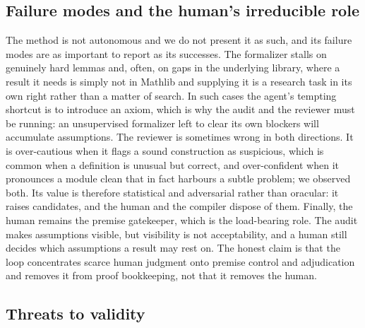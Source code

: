 \documentclass[11pt]{article}
\begin{document}
\subsection{Failure modes and the human's irreducible role}

The method is not autonomous and we do not present it as such, and its failure modes are as
important to report as its successes. The formalizer stalls on genuinely hard lemmas and, often, on
gaps in the underlying library, where a result it needs is simply not in Mathlib and supplying it is
a research task in its own right rather than a matter of search. In such cases the agent's tempting
shortcut is to introduce an axiom, which is why the audit and the reviewer must be running: an
unsupervised formalizer left to clear its own blockers will accumulate assumptions. The reviewer is
sometimes wrong in both directions. It is over-cautious when it flags a sound construction as
suspicious, which is common when a definition is unusual but correct, and over-confident when it
pronounces a module clean that in fact harbours a subtle problem; we observed both. Its value is
therefore statistical and adversarial rather than oracular: it raises candidates, and the human and
the compiler dispose of them. Finally, the human remains the premise gatekeeper, which is the
load-bearing role. The audit makes assumptions visible, but visibility is not acceptability, and a
human still decides which assumptions a result may rest on. The honest claim is that the loop
concentrates scarce human judgment onto premise control and adjudication and removes it from proof
bookkeeping, not that it removes the human.

\subsection{Threats to validity}
\end{document}
